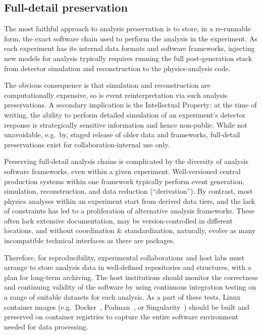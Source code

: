 \documentclass[11pt]{article}
\begin{document}
\subsection{Full-detail preservation} 

The most faithful approach to analysis preservation is to store, in a re-runnable form, the exact software chain used to perform the analysis in the experiment. As each experiment has its internal data formats and software frameworks, injecting new models for analysis typically requires running the full post-generation stack from detector simulation and reconstruction to the physics-analysis code.

The obvious consequence is that simulation and reconstruction are computationally expensive, so is event reinterpretation via such analysis preservations. A secondary implication is the Intellectual Property: at the time of writing, the ability to perform detailed simulation of an experiment's detector response is strategically sensitive information and hence non-public. While not unavoidable, e.g.~by, staged release of older data and frameworks, full-detail preservations exist for collaboration-internal use only.

Preserving full-detail analysis chains is complicated by the diversity of analysis software frameworks, even within a given experiment. Well-versioned central production systems within one framework typically perform event generation, simulation, reconstruction, and data reduction (``derivation''). By contrast, most physics analyses within an experiment start from derived data tiers, and the lack of constraints has led to a proliferation of alternative analysis frameworks. These often lack extensive documentation, may be version-controlled in different locations, and without coordination \& standardization, naturally, evolve as many incompatible technical interfaces as there are packages.

Therefore, for reproducibility, experimental collaborations and host labs must arrange to store analysis data in well-defined repositories and structures, with a plan for long-term archiving. The host institutions should monitor the correctness and continuing validity of the software by using continuous integration testing on a range of suitable datasets for each analysis. As a part of these tests, Linux container images (e.g.~Docker~\cite{docker}, Podman~\cite{podman}, or Singularity~\cite{singularity}) should be built and preserved on container registries to capture the entire software environment needed for data processing.
\end{document}
